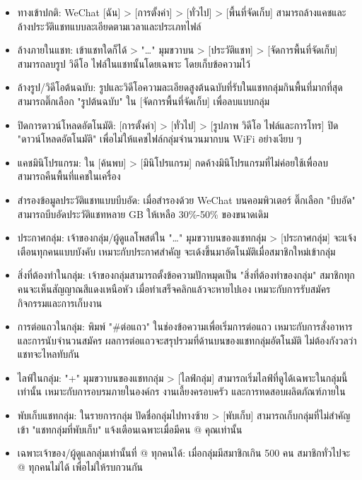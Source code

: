 \begin{itemize}
  \item ทางเข้าปกติ: WeChat [ฉัน] > [การตั้งค่า] > [ทั่วไป] > [พื้นที่จัดเก็บ] สามารถล้างแคชและล้างประวัติแชทแบบละเอียดตามเวลาและประเภทไฟล์
  \item ล้างภายในแชท: เข้าแชทใดก็ได้ > "…" มุมขวาบน > [ประวัติแชท] > [จัดการพื้นที่จัดเก็บ] สามารถลบรูป วิดีโอ ไฟล์ในแชทนั้นโดยเฉพาะ โดยเก็บข้อความไว้
  \item ล้างรูป/วิดีโอต้นฉบับ: รูปและวิดีโอความละเอียดสูงต้นฉบับที่รับในแชทกลุ่มกินพื้นที่มากที่สุด สามารถติ๊กเลือก "รูปต้นฉบับ" ใน [จัดการพื้นที่จัดเก็บ] เพื่อลบแบบกลุ่ม
  \item ปิดการดาวน์โหลดอัตโนมัติ: [การตั้งค่า] > [ทั่วไป] > [รูปภาพ วิดีโอ ไฟล์และการโทร] ปิด "ดาวน์โหลดอัตโนมัติ" เพื่อไม่ให้แคชไฟล์กลุ่มจำนวนมากบน WiFi อย่างเงียบ ๆ
  \item แคชมินิโปรแกรม: ใน [ค้นพบ] > [มินิโปรแกรม] กดค้างมินิโปรแกรมที่ไม่ค่อยใช้เพื่อลบ สามารถคืนพื้นที่แคชในเครื่อง
  \item สำรองข้อมูลประวัติแชทแบบบีบอัด: เมื่อสำรองด้วย WeChat บนคอมพิวเตอร์ ติ๊กเลือก "บีบอัด" สามารถบีบอัดประวัติแชทหลาย GB ให้เหลือ 30\%-50\% ของขนาดเดิม
\end{itemize}


\begin{itemize}
  \item ประกาศกลุ่ม: เจ้าของกลุ่ม/ผู้ดูแลโพสต์ใน "…" มุมขวาบนของแชทกลุ่ม > [ประกาศกลุ่ม] จะแจ้งเตือนทุกคนแบบบังคับ เหมาะกับประกาศสำคัญ จะเด้งขึ้นมาอัตโนมัติเมื่อสมาชิกใหม่เข้ากลุ่ม
  \item สิ่งที่ต้องทำในกลุ่ม: เจ้าของกลุ่มสามารถตั้งข้อความปักหมุดเป็น "สิ่งที่ต้องทำของกลุ่ม" สมาชิกทุกคนจะเห็นสัญญาณสีแดงเหนือหัว เมื่อทำเสร็จคลิกแล้วจะหายไปเอง เหมาะกับการรับสมัครกิจกรรมและการเก็บงาน
  \item การต่อแถวในกลุ่ม: พิมพ์ "\#ต่อแถว" ในช่องข้อความเพื่อเริ่มการต่อแถว เหมาะกับการสั่งอาหารและการนับจำนวนสมัคร ผลการต่อแถวจะสรุปรวมที่ด้านบนของแชทกลุ่มอัตโนมัติ ไม่ต้องกังวลว่าแชทจะไหลทับกัน
  \item ไลฟ์ในกลุ่ม: "+" มุมขวาบนของแชทกลุ่ม > [ไลฟ์กลุ่ม] สามารถเริ่มไลฟ์ที่ดูได้เฉพาะในกลุ่มนี้เท่านั้น เหมาะกับการอบรมภายในองค์กร งานเลี้ยงครอบครัว และการทดสอบผลิตภัณฑ์ภายใน
  \item พับเก็บแชทกลุ่ม: ในรายการกลุ่ม ปัดชื่อกลุ่มไปทางซ้าย > [พับเก็บ] สามารถเก็บกลุ่มที่ไม่สำคัญเข้า "แชทกลุ่มที่พับเก็บ" แจ้งเตือนเฉพาะเมื่อมีคน @ คุณเท่านั้น
  \item เฉพาะเจ้าของ/ผู้ดูแลกลุ่มเท่านั้นที่ @ ทุกคนได้: เมื่อกลุ่มมีสมาชิกเกิน 500 คน สมาชิกทั่วไปจะ @ ทุกคนไม่ได้ เพื่อไม่ให้รบกวนกัน
\end{itemize}

